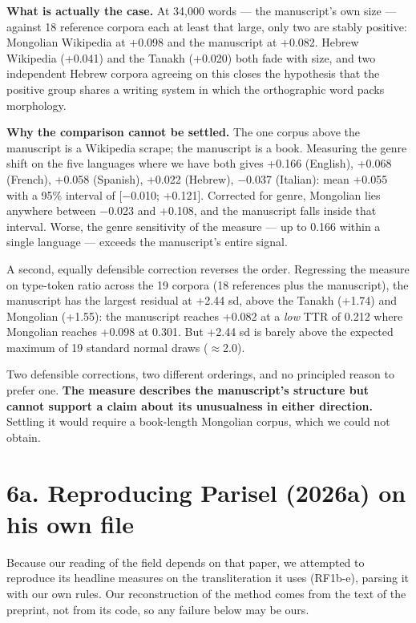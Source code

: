 \documentclass[11pt,a4paper]{article}
\begin{document}
\textbf{What is actually the case.} At 34,000 words --- the manuscript's own size --- against 18 reference corpora each at least that large, only two are stably positive: Mongolian Wikipedia at +0.098 and the manuscript at +0.082. Hebrew Wikipedia (+0.041) and the Tanakh (+0.020) both fade with size, and two independent Hebrew corpora agreeing on this closes the hypothesis that the positive group shares a writing system in which the orthographic word packs morphology.


\textbf{Why the comparison cannot be settled.} The one corpus above the manuscript is a Wikipedia scrape; the manuscript is a book. Measuring the genre shift on the five languages where we have both gives +0.166 (English), +0.068 (French), +0.058 (Spanish), +0.022 (Hebrew), $-$0.037 (Italian): mean +0.055 with a 95\% interval of [$-$0.010; +0.121]. Corrected for genre, Mongolian lies anywhere between $-$0.023 and +0.108, and the manuscript falls inside that interval. Worse, the genre sensitivity of the measure --- up to 0.166 within a single language --- exceeds the manuscript's entire signal.


A second, equally defensible correction reverses the order. Regressing the measure on type-token ratio across the 19 corpora (18 references plus the manuscript), the manuscript has the largest residual at +2.44 sd, above the Tanakh (+1.74) and Mongolian (+1.55): the manuscript reaches +0.082 at a \emph{low} TTR of 0.212 where Mongolian reaches +0.098 at 0.301. But +2.44 sd is barely above the expected maximum of 19 standard normal draws ($\approx$2.0).


Two defensible corrections, two different orderings, and no principled reason to prefer one. \textbf{The measure describes the manuscript's structure but cannot support a claim about its unusualness in either direction.} Settling it would require a book-length Mongolian corpus, which we could not obtain.

\section*{6a. Reproducing Parisel (2026a) on his own file}


Because our reading of the field depends on that paper, we attempted to reproduce its headline measures on the transliteration it uses (RF1b-e), parsing it with our own rules. Our reconstruction of the method comes from the text of the preprint, not from its code, so any failure below may be ours.
\end{document}

